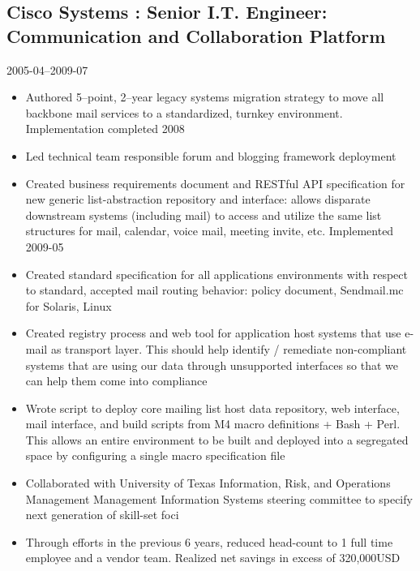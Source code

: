 \documentclass[]{article}
\begin{document}
\subsection*{Cisco Systems : Senior I.T. Engineer: Communication and Collaboration Platform}
  \label{ciscosystems_rdfa_cisco_recent_title:_rdfa_cisco_recent_desc}
  2005-04--2009-07
\begin{itemize}
    \item{Authored 5–point, 2–year legacy systems migration strategy to move all backbone mail services to a standardized, turnkey environment.  Implementation completed 2008}
    \item{Led technical team responsible forum and blogging framework deployment}
    \item{Created business requirements document and RESTful API specification for new generic list-abstraction repository and interface: allows disparate downstream systems (including mail) to access and utilize the same list structures for mail, calendar, voice mail, meeting invite, etc.  Implemented 2009-05}
    \item{Created standard specification for all applications environments with respect to standard, accepted mail routing behavior: policy document, Sendmail.mc for Solaris, Linux}
    \item{Created registry process and web tool for application host systems that use e-mail as transport layer. This should help identify / remediate non-compliant systems that are using our data through unsupported interfaces so that we can help them come into compliance}
    \item{Wrote script to deploy core mailing list host data repository, web interface, mail interface, and build scripts from M4 macro definitions + Bash + Perl. This allows an entire environment to be built and deployed into a segregated space by configuring a single macro specification file}
    \item{Collaborated with University of Texas  Information, Risk, and Operations Management Management Information Systems steering committee to specify next generation of skill-set foci}
    \item{Through efforts in the previous 6 years, reduced head-count to 1 full time employee and a vendor team.  Realized net savings in excess of 320,000USD}
\end{itemize}
       
\end{document}

